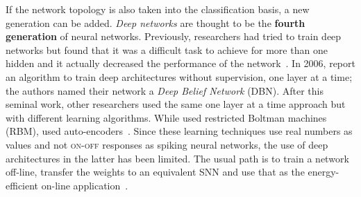 If the network topology is also taken into the classification basis, a new generation can be added. \emph{Deep networks} are thought to be the \textbf{fourth generation} of neural networks. Previously, researchers had tried to train deep networks but found that it was a difficult task to achieve for more than one hidden and it actually decreased the performance of the network~\cite{learning-deep-Bengio2009}. In 2006, \citeauthor{hinton2006fast} report an algorithm to train deep architectures without supervision, one layer at a time; the authors named their network a \emph{Deep Belief Network} (DBN). After this seminal work, other researchers used the same one layer at a time  approach but with different learning algorithms. While \citeauthor{hinton2006fast} used restricted Boltman machines (RBM), \citeauthor{autoencoders-lecun2007} used auto-encoders~\cite{autoencoders-lecun2007}. Since these learning techniques use real numbers as values and not \textsc{on-off} responses as spiking neural networks, the use of deep architectures in the latter has been limited. The usual path is to train a network off-line, transfer the weights to an equivalent SNN and use that as the energy-efficient on-line application~\cite{evangelos-deep-belief,diehlfast-deep-net}.